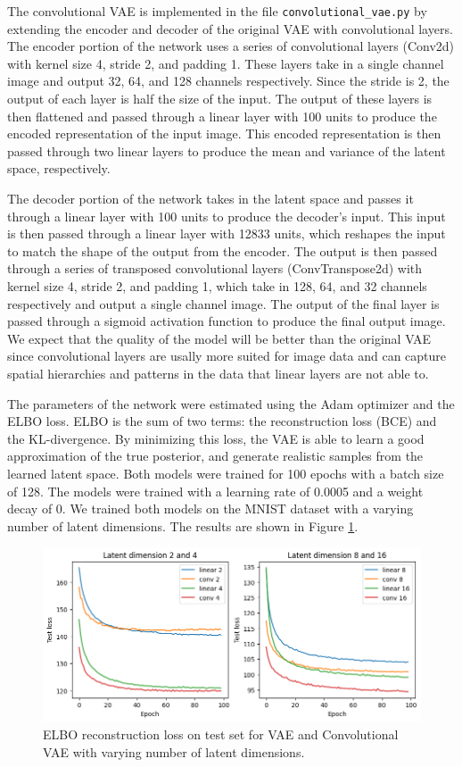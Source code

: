 The convolutional VAE is implemented in the file \texttt{convolutional\_vae.py} by extending the encoder and decoder of the original VAE with convolutional layers. The encoder portion of the network uses a series of convolutional layers (Conv2d) with kernel size 4, stride 2, and padding 1. These layers take in a single channel image and output 32, 64, and 128 channels respectively. Since the stride is 2, the output of each layer is half the size of the input. The output of these layers is then flattened and passed through a linear layer with 100 units to produce the encoded representation of the input image. This encoded representation is then passed through two linear layers to produce the mean and variance of the latent space, respectively.

The decoder portion of the network takes in the latent space and passes it through a linear layer with 100 units to produce the decoder's input. This input is then passed through a linear layer with 12833 units, which reshapes the input to match the shape of the output from the encoder. The output is then passed through a series of transposed convolutional layers (ConvTranspose2d) with kernel size 4, stride 2, and padding 1, which take in 128, 64, and 32 channels respectively and output a single channel image. The output of the final layer is passed through a sigmoid activation function to produce the final output image. We expect that the quality of the model will be better than the original VAE since convolutional layers are usally more suited for image data and can capture spatial hierarchies and patterns in the data that linear layers are not able to.

The parameters of the network were estimated using the Adam optimizer and the ELBO loss. ELBO is the sum of two terms: the reconstruction loss (BCE) and the KL-divergence. By minimizing this loss, the VAE is able to learn a good approximation of the true posterior, and generate realistic samples from the learned latent space. Both models were trained for 100 epochs with a batch size of 128. The models were trained with a learning rate of 0.0005 and a weight decay of 0. We trained both models on the MNIST dataset with a varying number of latent dimensions. The results are shown in Figure \ref{fig:vaeloss}.

\begin{figure}[H]
\centering
\includegraphics[width=\textwidth]{images/test_loss.png}
\caption{ELBO reconstruction loss on test set for VAE and Convolutional VAE with varying number of latent dimensions.}
\label{fig:vaeloss}
\end{figure}

